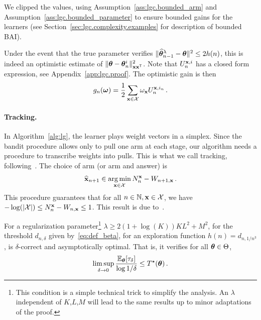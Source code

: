We clipped the values, using Assumption~\ref{ass:lgc.bounded_arm} and Assumption~\ref{ass:lgc.bounded_parameter} to ensure bounded gains for the learners (see Section~\ref{sec:lgc.complexity.examples} for description of bounded BAI). 

Under the event that the true parameter verifies $\Vert \widehat{{\boldsymbol \theta}}_{n-1}^\lambda - {\boldsymbol \theta} \Vert^2 \le 2 h(n)$, this is indeed an optimistic estimate of $\Vert {\boldsymbol \theta} - {\boldsymbol \theta}_n^i \Vert^2_{{\bf x}{\bf x}^\mathsf{\scriptscriptstyle T}}$. Note that $U_n^{{\bf x},i}$ has a closed form expression, see Appendix~\ref{app:lgc.proof}. The optimistic gain is then
\[
    g_{n}({\boldsymbol \omega}) = \frac{1}{2}\sum_{{\bf x}\in\mathcal{X}}\omega_{\bf x} U_n^{{\bf x},i_n}\,.
\]


\paragraph{Tracking.} In Algorithm~\ref{alg:lg}, the learner plays weight vectors in a simplex. Since the bandit procedure allows only to pull one arm at each stage, our algorithm needs a procedure to transcribe weights into pulls. This is what we call tracking, following~\citet{garivier2016tracknstop}. The choice of arm (or arm and answer) is
\begin{align*}
    \widehat{{\bf x}}_{n+1} \in \operatorname*{arg\,min}_{{\bf x}\in \mathcal{X} } N_{n}^{{\bf x}} - W_{n+1,{\bf x}}\,.
\end{align*}
This procedure guarantees that for all $n\in{\mathbb N}, {\bf x}\in\mathcal{X}$, we have $- \log (|\mathcal{X}|) \le N_n^{{\bf x}} - W_{n,{\bf x}} \le 1$. This result is due to~\citet{degenne2020structure}.

\begin{theorem}\label{thm:lgc.sample_complexity}
\begin{leftbar}[theorembar]
For a regularization parameter\footnote{This condition is a simple technical trick to simplify the analysis. An $\lambda$ independent of $K$,$L$,$M$ will lead to the same results up to minor adaptations of the proof.} $\lambda \geq 2(1+\log(K))KL^2+M^2$, for the threshold $d_{n,\delta}$ given by~\eqref{eq:def_beta}, for an exploration function $h(n)=d_{n,1/n^3}$, \LG{} is $\delta$-correct and asymptotically optimal. That is, it verifies for all ${\boldsymbol \theta}\in \Theta$,
\begin{align*}
    \limsup_{\delta\to 0}\frac{\mathbb{E}_{\boldsymbol \theta}[\tau_\delta]}{ \log 1/\delta} \le T^{\star}({\boldsymbol \theta}) \,.
\end{align*}
\end{leftbar}
\end{theorem}

